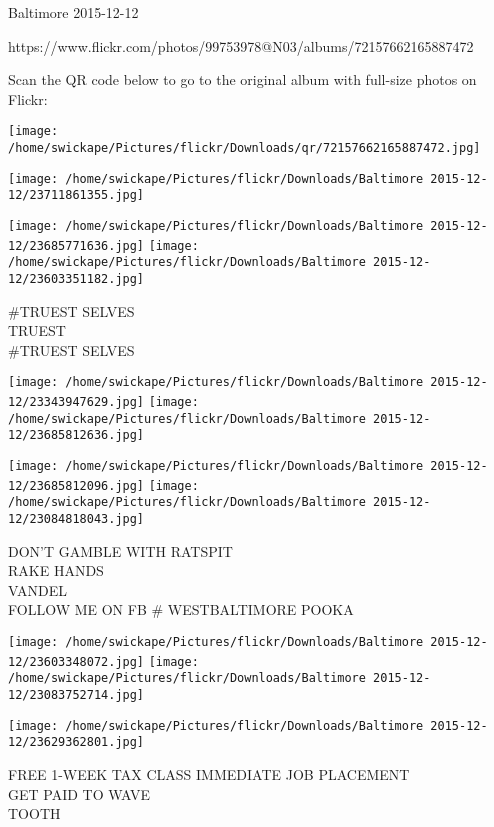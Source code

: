 \documentclass[10pt,letterpaper]{article}
\begin{document}
Baltimore 2015-12-12

https://www.flickr.com/photos/99753978@N03/albums/72157662165887472

Scan the QR code below to go to the original album with full-size photos on Flickr:

\texttt{[image: /home/swickape/Pictures/flickr/Downloads/qr/72157662165887472.jpg]}
\pagebreak

\texttt{[image: /home/swickape/Pictures/flickr/Downloads/Baltimore 2015-12-12/23711861355.jpg]}

\vspace{0.25in}
\texttt{[image: /home/swickape/Pictures/flickr/Downloads/Baltimore 2015-12-12/23685771636.jpg]}
\texttt{[image: /home/swickape/Pictures/flickr/Downloads/Baltimore 2015-12-12/23603351182.jpg]}

\#TRUEST SELVES\\
TRUEST\\
\#TRUEST SELVES\\
\pagebreak

\texttt{[image: /home/swickape/Pictures/flickr/Downloads/Baltimore 2015-12-12/23343947629.jpg]}
\texttt{[image: /home/swickape/Pictures/flickr/Downloads/Baltimore 2015-12-12/23685812636.jpg]}

\texttt{[image: /home/swickape/Pictures/flickr/Downloads/Baltimore 2015-12-12/23685812096.jpg]}
\texttt{[image: /home/swickape/Pictures/flickr/Downloads/Baltimore 2015-12-12/23084818043.jpg]}

DON'T GAMBLE WITH RATSPIT\\
RAKE HANDS\\
VANDEL\\
FOLLOW ME ON FB \# WESTBALTIMORE POOKA\\
\pagebreak

\texttt{[image: /home/swickape/Pictures/flickr/Downloads/Baltimore 2015-12-12/23603348072.jpg]}
\texttt{[image: /home/swickape/Pictures/flickr/Downloads/Baltimore 2015-12-12/23083752714.jpg]}

\vspace{0.25in}
\texttt{[image: /home/swickape/Pictures/flickr/Downloads/Baltimore 2015-12-12/23629362801.jpg]}

FREE 1{-}WEEK TAX CLASS IMMEDIATE JOB PLACEMENT\\
GET PAID TO WAVE\\
TOOTH\\
\pagebreak
\end{document}
